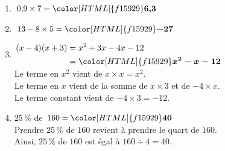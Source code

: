 \documentclass[a4paper,11pt,landscape,exos]{nsi} %
\begin{document}
\begin{multicols}{2}
\maketitle

\begin{enumerate}[]
\item $0{,}9 \times 7={\color[HTML]{f15929}\boldsymbol{6{,}3}}$
\item $13-8\times5={\color[HTML]{f15929}\boldsymbol{-27}}$
\item $\begin{aligned}
      (x-4)(x+3)&=x^2+3x-4x-12\\
      &={\color[HTML]{f15929}\boldsymbol{x^2-x-12}}
      \end{aligned}$\\Le terme en $x^2$ vient de $x\times x=x^2$.\\Le terme en $x$ vient de la somme de $x \times 3$ et de $-4 \times x$.\\Le terme constant vient de $-4\times 3= -12$.
\item $25\,\%$ de $160 = {\color[HTML]{f15929}\boldsymbol{40}}$\\ Prendre $25\,\%$  de $160$ revient à prendre le quart de $160$.\\
      Ainsi, $25\,\%$ de $160$ est égal à $160\div 4 =40$.
     

\end{enumerate}
\end{multicols}
\end{document}
